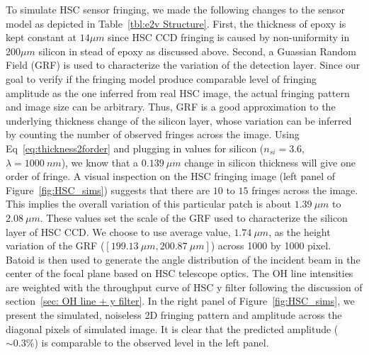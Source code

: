 \documentclass[twocolumn]{aastex63} %
\begin{document}
\begin{CJK*}{UTF8}{gbsn}
To simulate HSC sensor fringing, we made the following changes to the sensor model as depicted in Table~\ref{tbl:e2v Structure}. First, the thickness of epoxy is kept constant at $14\mu m$ since HSC CCD fringing is caused by non-uniformity in 200$\mu m$ silicon in stead of epoxy as discussed above. Second, a Guassian Random Field (GRF) is used to characterize the variation of the detection layer. Since our goal to verify if the fringing model produce comparable level of fringing amplitude as the one inferred from real HSC image, the actual fringing pattern and image size can be arbitrary. Thus, GRF is a good approximation to the underlying thickness change of the silicon layer, whose variation can be inferred by counting the number of observed fringes across the image. Using Eq~\ref{eq:thickness2forder} and plugging in values for silicon ($n_{si} = 3.6$, $\lambda = 1000\ nm$), we know that a $0.139\ \mu m$ change in silicon thickness will give one order of fringe. A visual inspection on the HSC fringing image (left panel of Figure~\ref{fig:HSC_sims}) suggests that there are $10$ to $15$ fringes across the image. This implies the overall variation of this particular patch is about $1.39\ \mu m$ to $2.08\ \mu m$. These values set the scale of the GRF used to characterize the silicon layer of HSC CCD. We choose to use average value, $1.74\ \mu m$, as the height variation of the GRF ($[199.13\ \mu m, 200.87\ \mu m]$) across 1000 by 1000 pixel.
Batoid is then used to generate the angle distribution of the incident beam in the center of the focal plane based on HSC telescope optics. The OH line intensities are weighted with the throughput curve of HSC y filter following the discussion of section~\ref{sec: OH line + y filter}. In the right panel of Figure~\ref{fig:HSC_sims}, we present the simulated, noiseless 2D fringing pattern and amplitude across the diagonal pixels of simulated image. It is clear that the predicted  amplitude ($\sim 0.3\%$) is comparable to the observed level in the left panel.


\end{CJK*}
\end{document}

